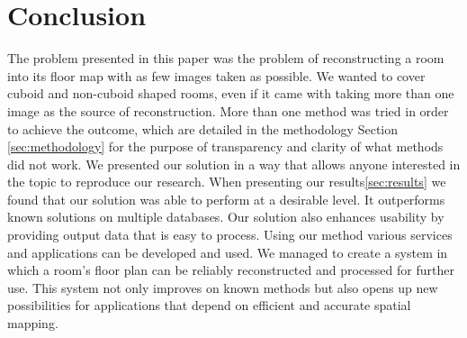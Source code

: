 \section{Conclusion}
\label{sec:conclusion}
The problem presented in this paper was the problem of reconstructing a room into its floor map with as few images taken as possible. We wanted to cover cuboid and non-cuboid shaped rooms, even if it came with taking more than one image as the source of reconstruction. More than one method was tried in order to achieve the outcome, which are detailed in the methodology Section \ref{sec:methodology} for the purpose of transparency and clarity of what methods did not work. We presented our solution in a way that allows anyone interested in the topic to reproduce our research. When presenting our results\ref{sec:results} we found that our solution was able to perform at a desirable level. It outperforms known solutions on multiple databases. Our solution also enhances usability by providing output data that is easy to process. Using our method various services and applications can be developed and used. We managed to create a system in which a room's floor plan can be reliably reconstructed and processed for further use. This system not only improves on known methods but also opens up new possibilities for applications that depend on efficient and accurate spatial mapping.